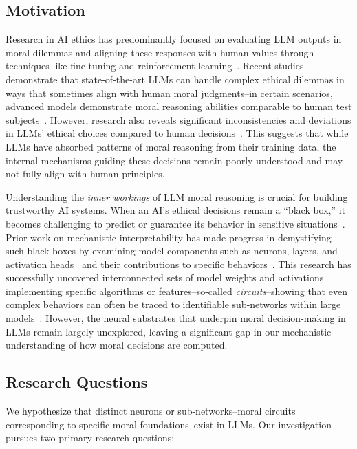 \documentclass[runninghheads]{llncs}
\newcommand{\qq}[1]{``#1''}  %
\begin{document}
\subsection{Motivation}

Research in AI ethics has predominantly focused on evaluating LLM outputs in moral dilemmas and aligning these responses with human values through techniques like fine-tuning and reinforcement learning~\cite{Rao2023}.
Recent studies demonstrate that state-of-the-art LLMs can handle complex ethical dilemmas in ways that sometimes align with human moral judgments--in certain scenarios, advanced models demonstrate moral reasoning abilities comparable to human test subjects~\cite{Tanmay2023}.
However, research also reveals significant inconsistencies and deviations in LLMs' ethical choices compared to human decisions~\cite{Takemoto2024}.
This suggests that while LLMs have absorbed patterns of moral reasoning from their training data, the internal mechanisms guiding these decisions remain poorly understood and may not fully align with human principles.

Understanding the \emph{inner workings} of LLM moral reasoning is crucial for building trustworthy AI systems.
When an AI's ethical decisions remain a \qq{black box,} it becomes challenging to predict or guarantee its behavior in sensitive situations~\cite{Templeton2024}.
Prior work on mechanistic interpretability has made progress in demystifying such black boxes by examining model components such as neurons, layers, and activation heads~\cite{olah_building_2018,bereska_mechanistic_2024} and their contributions to specific behaviors~\cite{Tlaie2024}.
This research has successfully uncovered interconnected sets of model weights and activations implementing specific algorithms or features--so-called \emph{circuits}--showing that even complex behaviors can often be traced to identifiable sub-networks within large models~\cite{Stolfo2023}.
However, the neural substrates that underpin moral decision-making in LLMs remain largely unexplored, leaving a significant gap in our mechanistic understanding of how moral decisions are computed.

\subsection{Research Questions}

We hypothesize that distinct neurons or sub-networks--moral circuits corresponding to specific moral foundations--exist in LLMs. Our investigation pursues two primary research questions:
\end{document}
